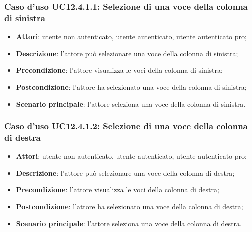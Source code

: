 \subsubsection{Caso d'uso UC12.4.1.1: Selezione di una voce della colonna di sinistra}
\begin{itemize}
\item \textbf{Attori}: utente non autenticato, utente autenticato, utente autenticato pro;
\item \textbf{Descrizione}: l'attore può selezionare una voce della colonna di sinistra;
\item \textbf{Precondizione}: l'attore visualizza le voci della colonna di sinistra;
\item \textbf{Postcondizione}: l'attore ha selezionato una voce della colonna di sinistra;
\item \textbf{Scenario principale}: l'attore seleziona una voce della colonna di sinistra. 
\end{itemize}

\subsubsection{Caso d'uso UC12.4.1.2: Selezione di una voce della colonna di destra}
\begin{itemize}
\item \textbf{Attori}: utente non autenticato, utente autenticato, utente autenticato pro;
\item \textbf{Descrizione}: l'attore può selezionare una voce della colonna di destra;
\item \textbf{Precondizione}: l'attore visualizza le voci della colonna di destra;
\item \textbf{Postcondizione}: l'attore ha selezionato una voce della colonna di destra;
\item \textbf{Scenario principale}: l'attore seleziona una voce della colonna di destra. 
\end{itemize}

